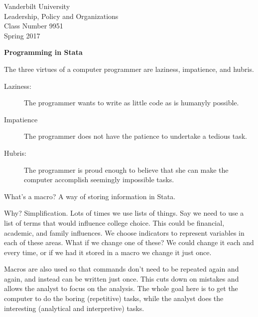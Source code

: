 \documentclass[10pt]{article}
\begin{document}
\thispagestyle{empty}%


\setmarginsrb{1in}{.5in}{.1in}{.5in}{0pt}{0mm}{0pt}{0mm}%

\setlength{\parskip}{1ex plus 0.5ex minus 0.2ex}

\setcounter{secnumdepth}{-2}



\begin{flushleft}
Vanderbilt University\\Leadership, Policy and Organizations\\Class Number 9951\\ Spring 2017\\
\end{flushleft}



\begin{center}
  \textbf{Programming in Stata}
\end{center}

The three virtues of a computer programmer are laziness, impatience, and hubris. 

\begin{description}
\item[Laziness:] The programmer wants to write as little code as is humanyly possible.

\item[Impatience] The programmer does not have the patience to undertake a tedious task.

\item[Hubris:] The programmer is proud enough to believe that she can
  make the computer accomplish seemingly impossible tasks. 

\end{description}

What's a macro? A way of storing information in Stata. 

Why? Simplification. Lots of times we use lists of things. Say we need
to use a list of terms that would influence college choice. This could
be financial, academic, and family influences. We choose indicators to
represent variables in each of these areas. What if we change one of
these? We could change it each and every time, or if we had it stored
in a macro we change it just once. 

Macros are also used so that commands don't need to be repeated again
and again, and instead can be written just once. This cuts down on
mistakes and allows the analyst to focus on the analysis. The whole
goal here is to get the computer to do the boring (repetitive) tasks,
while the analyst does the interesting (analytical and interpretive)
tasks. 
\end{document}
